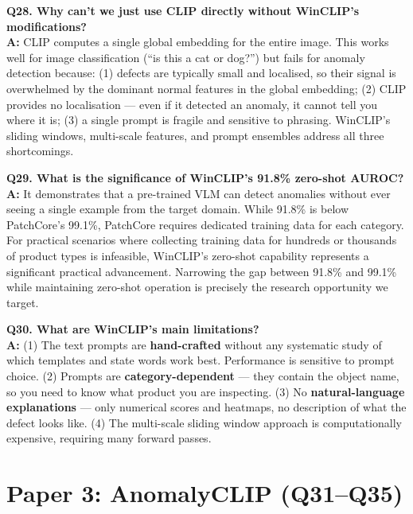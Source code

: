 \documentclass[12pt, a4paper]{article}
\begin{document}
\begin{qa}
\textbf{Q28. Why can't we just use CLIP directly without WinCLIP's modifications?}\\[4pt]
\textbf{A:} CLIP computes a single global embedding for the entire image. This works well for image classification (``is this a cat or dog?'') but fails for anomaly detection because: (1) defects are typically small and localised, so their signal is overwhelmed by the dominant normal features in the global embedding; (2) CLIP provides no localisation --- even if it detected an anomaly, it cannot tell you where it is; (3) a single prompt is fragile and sensitive to phrasing. WinCLIP's sliding windows, multi-scale features, and prompt ensembles address all three shortcomings.
\end{qa}

\begin{qa}
\textbf{Q29. What is the significance of WinCLIP's 91.8\% zero-shot AUROC?}\\[4pt]
\textbf{A:} It demonstrates that a pre-trained VLM can detect anomalies without ever seeing a single example from the target domain. While 91.8\% is below PatchCore's 99.1\%, PatchCore requires dedicated training data for each category. For practical scenarios where collecting training data for hundreds or thousands of product types is infeasible, WinCLIP's zero-shot capability represents a significant practical advancement. Narrowing the gap between 91.8\% and 99.1\% while maintaining zero-shot operation is precisely the research opportunity we target.
\end{qa}

\begin{qa}
\textbf{Q30. What are WinCLIP's main limitations?}\\[4pt]
\textbf{A:} (1) The text prompts are \textbf{hand-crafted} without any systematic study of which templates and state words work best. Performance is sensitive to prompt choice. (2) Prompts are \textbf{category-dependent} --- they contain the object name, so you need to know what product you are inspecting. (3) No \textbf{natural-language explanations} --- only numerical scores and heatmaps, no description of what the defect looks like. (4) The multi-scale sliding window approach is computationally expensive, requiring many forward passes.
\end{qa}

\section{Paper 3: AnomalyCLIP (Q31--Q35)}
\end{document}
